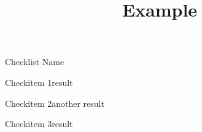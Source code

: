 \documentclass[12pt]{article}
\begin{document}
\title{Example}

\begin{checklist}{Checklist Name}
  \item{Checkitem 1}{result}
  \item{Checkitem 2}{another result}
    \item{Checkitem 3}{result}
\end{checklist}
\end{document}

